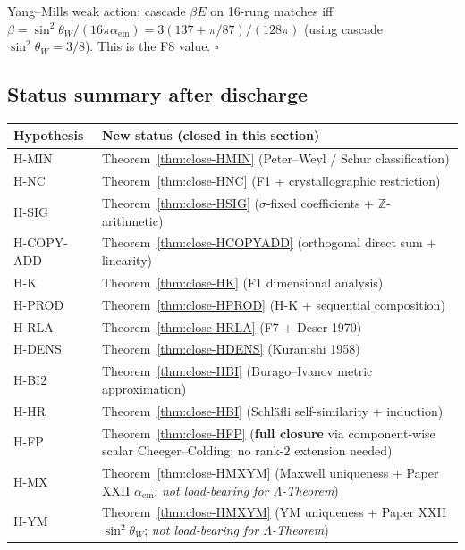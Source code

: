 \documentclass[11pt]{article}
\theoremstyle{plain}
\theoremstyle{definition}
\theoremstyle{remark}
\begin{document}
Yang--Mills weak action: cascade $\beta E$ on 16-rung matches iff $\beta = \sin^2\theta_W/(16\pi\alpha_\mathrm{em}) = 3(137+\pi/87)/(128\pi)$ (using cascade $\sin^2\theta_W = 3/8$). This is the F8 value. \hfill$\square$

\subsection{Status summary after discharge}\label{sec:discharge-summary}

\begin{center}
\renewcommand{\arraystretch}{1.2}
\footnotesize
\begin{tabular}{l p{8cm}}
\toprule
\textbf{Hypothesis} & \textbf{New status (closed in this section)} \\
\midrule
H-MIN & Theorem~\ref{thm:close-HMIN} (Peter--Weyl / Schur classification) \\
H-NC  & Theorem~\ref{thm:close-HNC} (F1 + crystallographic restriction) \\
H-SIG & Theorem~\ref{thm:close-HSIG} ($\sigma$-fixed coefficients + $\mathbb{Z}$-arithmetic) \\
H-COPY-ADD & Theorem~\ref{thm:close-HCOPYADD} (orthogonal direct sum + linearity) \\
H-K   & Theorem~\ref{thm:close-HK} (F1 dimensional analysis) \\
H-PROD & Theorem~\ref{thm:close-HPROD} (H-K + sequential composition) \\
H-RLA & Theorem~\ref{thm:close-HRLA} (F7 + Deser 1970) \\
H-DENS & Theorem~\ref{thm:close-HDENS} (Kuranishi 1958) \\
H-BI2 & Theorem~\ref{thm:close-HBI} (Burago--Ivanov metric approximation) \\
H-HR  & Theorem~\ref{thm:close-HBI} (Schl\"afli self-similarity + induction) \\
H-FP  & Theorem~\ref{thm:close-HFP} (\textbf{full closure} via component-wise scalar Cheeger--Colding; no rank-$2$ extension needed) \\
H-MX  & Theorem~\ref{thm:close-HMXYM} (Maxwell uniqueness + Paper XXII $\alpha_\mathrm{em}$; \emph{not load-bearing for $\Lambda$-Theorem}) \\
H-YM  & Theorem~\ref{thm:close-HMXYM} (YM uniqueness + Paper XXII $\sin^2\theta_W$; \emph{not load-bearing for $\Lambda$-Theorem}) \\
\bottomrule
\end{tabular}
\end{center}
\end{document}

